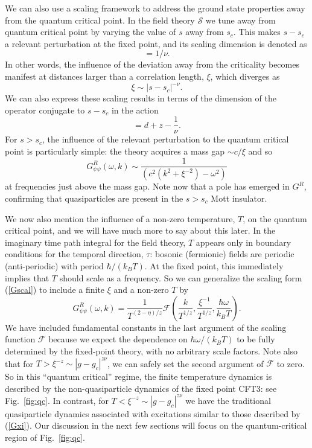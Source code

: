 \documentclass[10pt, oneside]{book}
\def\be{\begin{equation}}
\def\ee{\end{equation}}
\begin{document}
\begin{doublespace}
We can also use a scaling framework to address the ground state properties away from the quantum critical point. In the field theory $\mathcal{S}$ we tune
away from quantum critical point by varying the value of $s$ away from $s_c$. This makes $s-s_c$ a relevant perturbation at the fixed point, 
and its scaling dimension is denoted as
\be
[s-s_c] = 1/\nu.
\ee
In other words, the influence of the deviation away from the criticality becomes manifest at distances 
larger than a correlation length, $\xi$,  which diverges as
\be
\xi \sim |s-s_c|^{-\nu}. 
\ee
We can also express these scaling results in terms of the dimension of the operator conjugate to $s-s_c$ in the action
\be
[|\psi|^2 ] = d+z - \frac{1}{\nu}. \label{thermalop}
\ee
For $s>s_c$, the influence of the relevant perturbation to the quantum critical point is particularly simple: the theory acquires a mass gap $\sim c/\xi$
and so
\be
G^R_{\psi\psi} (\omega, k) \sim \frac{1}{(c^2 (k^2 + \xi^{-2}) - \omega^2)} \label{Gxi}
\ee
at frequencies just above the mass gap. Note now that a pole has emerged in $G^R$, confirming that quasiparticles are present in the $s>s_c$ Mott insulator.

We now also mention the influence of a non-zero temperature, $T$, on the quantum critical point, and we will have much more to say about this later.
In the imaginary time path integral for the field theory, $T$ appears only in boundary conditions for the temporal direction, $\tau$: bosonic (fermionic) fields
are periodic (anti-periodic) with period $\hbar/(k_B T)$. At the fixed point, this immediately implies that $T$ should scale as a frequency. So we can generalize 
the scaling form (\ref{Gscal}) to include a finite $\xi$ and a non-zero $T$ by
\be
G^R_{\psi\psi} (\omega, k) = \frac{1}{T^{(2-\eta)/z}} \mathcal{F}\left( \frac{k}{T^{1/z}}, \frac{\xi^{-1}}{T^{1/z}}, \frac{\hbar \omega}{k_B T} \right) .
\label{Gscal2}
\ee
We have included fundamental constants in the last argument of the scaling function $\mathcal{F}$
because we expect the dependence on $\hbar \omega/(k_B T)$ to be fully 
determined by the fixed-point theory, with no arbitrary scale factors. Note also that for $T > \xi^{-z} \sim |g-g_c|^{z \nu}$, we can safely set
the second argument of $\mathcal{F}$ to zero. So in this ``quantum critical'' regime, the finite temperature dynamics is described by the
non-quasiparticle dynamics of the fixed point CFT3: see Fig.~\ref{fig:qc}. 
In contrast, for $T < \xi^{-z} \sim |g-g_c|^{z \nu}$ we have the 
traditional quasiparticle dynamics associated with excitations similar to those described by (\ref{Gxi}). Our discussion in the next few sections will focus on the quantum-critical region of Fig.~\ref{fig:qc}. 



\end{doublespace}
\end{document}
